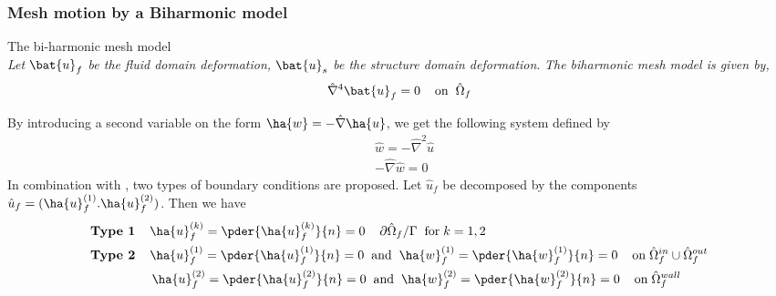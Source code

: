 \subsubsection*{Mesh motion by a Biharmonic model}
\begin{equat}
The bi-harmonic mesh model \\ \textit{Let} $\bat{u}_f$ \textit{be the fluid domain deformation,} $\bat{u}_s$ \textit{be the structure domain deformation}. \textit{The biharmonic mesh model is given by, }   
\begin{align*}
\hat{\nabla}^4 \bat{u}_f = 0 \hspace{4mm} \text{on} \hspace{2mm} \hat{\Omega}_f 
\end{align*}
\end{equat}
By introducing a second variable on the form $\ha{w} = - \hat{\nabla} \ha{u}$, we get the following system defined by 
\begin{align*}
&\hat{w} = -\hat{\nabla}^2\hat{u} \\
&- \hat{\nabla} \hat{w} = 0
\end{align*}
In combination with \cite{Wicka}, two types of boundary conditions are proposed. Let 
$\hat{u}_f$ be decomposed by the components $\hat{u}_f = (\ha{u}_f^{(1)}. \ha{u}_f^{(2)})$. Then we have
\begin{align*}
&\textbf{Type 1} \hspace{4mm} \ha{u}_f^{(k)} = \pder{\ha{u}_f^{(k)}}{n} = 0 \hspace{4mm} \partial \hat{\Omega}_f / \Gamma \hspace{2mm} \text{for} \hspace{1mm} k = 1, 2 \\
&\textbf{Type 2} \hspace{4mm} \ha{u}_f^{(1)} = \pder{\ha{u}_f^{(1)}}{n} = 0 
\hspace{2mm} \text{and} \hspace{2mm} \ha{w}_f^{(1)} = \pder{\ha{w}_f^{(1)}}{n} = 0 \hspace{4mm} \text{on} \hspace{1mm} \hat{\Omega}_f^{in} \cup \hat{\Omega}_f^{out} \\ 
&\hspace{17mm}  \ha{u}_f^{(2)} = \pder{\ha{u}_f^{(2)}}{n} = 0 
\hspace{2mm} \text{and} \hspace{2mm} \ha{w}_f^{(2)} = \pder{\ha{w}_f^{(2)}}{n} = 0 \hspace{4mm} \text{on} \hspace{1mm}  \hat{\Omega}_f^{wall}
\end{align*}
